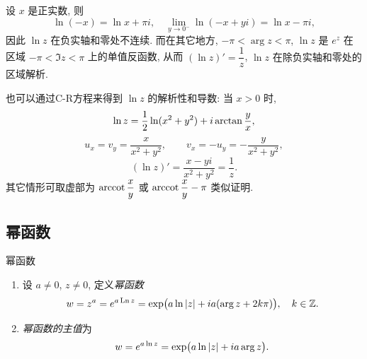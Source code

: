 设 $x$ 是正实数, 则
\[\ln (-x)=\ln x+\pi i,\quad
  \lim_{y\to0^-}\ln (-x+yi)=\ln x-\pi i,\]
因此 $\ln z$ 在负实轴和零处不连续.
而在其它地方, $-\pi<\arg z<\pi$, $\ln z$ 是 $e^z$ 在区域 $-\pi<\Im z<\pi$ 上的单值反函数, 
从而 \alert{$(\ln z)'=\dfrac 1z$}, \alert{$\ln z$ 在除负实轴和零处的区域解析}.

也可以通过C-R方程来得到 $\ln z$ 的解析性和导数: 当 $x>0$ 时,
\[\ln z=\frac{1}{2} \ln(x^2+y^2)+i\arctan \frac yx,\]
\[u_x=v_y=\frac x{x^2+y^2},\qquad v_x=-u_y=-\frac y{x^2+y^2},\]
\[(\ln z)'=\frac{x-yi}{x^2+y^2}=\frac 1z.\]
其它情形可取虚部为 $\operatorname{arccot}\dfrac xy$ 或 $\operatorname{arccot}\dfrac xy-\pi$ 类似证明.

\subsection{幂函数}

\begin{definition}{幂函数}
	\begin{enumerate}
		\item 设 $a\neq 0$, $z\neq 0$, 定义\emph{幂函数}
		\[w=z^a=e^{a\operatorname{Ln} z}
		=\exp\bigl(a\ln\left|z\right|+ia(\arg z+2k\pi)\bigr),\quad k\in{\mathbb{Z}}.\]
		\item \emph{幂函数的主值}为
		\[w=e^{a\ln z}=\exp\bigl(a\ln\left|z\right|+ia\arg z\bigr).\]
	\end{enumerate}
\end{definition}

